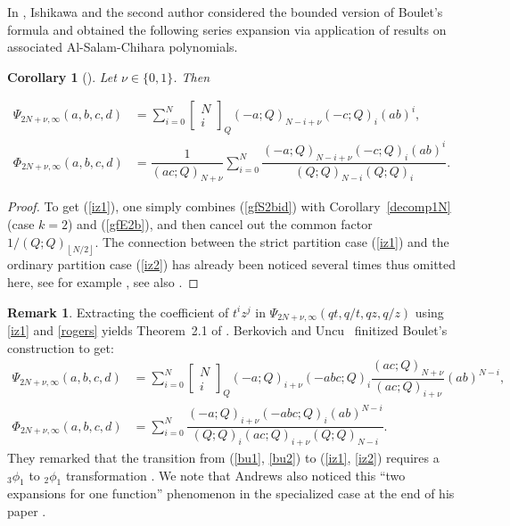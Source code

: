 \documentclass[12pt]{amsart}
\numberwithin{equation}{section}
\theoremstyle{plain}
\newtheorem{corollary}[theorem]{Corollary}
\theoremstyle{definition}
\newtheorem{remark}[theorem]{Remark}
\newcommand\qbin[3]{\left[\begin{matrix} #1 \\ #2 \end{matrix} \right]_{#3}}
\begin{document}
In \cite{iz}, Ishikawa and the second author considered the bounded version of Boulet's 
formula and obtained the following series expansion via application of results on associated Al-Salam-Chihara polynomials.
\begin{corollary}[\cite{iz}] Let $\nu\in\{0,1\}$. Then

\begin{align}
\label{iz1} \Psi_{2N+\nu,\infty}(a,b,c,d) &= \sum\limits_{i=0}^{N}\qbin{N}{i}{Q}(-a;Q)_{N-i+\nu}(-c;Q)_{i}(ab)^i, \\
\label{iz2} \Phi_{2N+\nu,\infty}(a,b,c,d) &= \dfrac{1}{(ac;Q)_{N+\nu}}\sum\limits_{i=0}^{N}\dfrac{(-a;Q)_{N-i+\nu}(-c;Q)_{i}(ab)^i}{(Q;Q)_{N-i}(Q;Q)_{i}}.
\end{align}

\end{corollary}
\begin{proof}
To get (\ref{iz1}), one simply combines (\ref{gfS2bid}) with Corollary~\ref{decomp1N} (case $k=2$) and (\ref{gfE2b}), and then cancel out the common factor $1/(Q;Q)_{\left\lfloor{N}/{2}\right\rfloor}$. The connection between the strict partition case (\ref{iz1}) and the ordinary partition case (\ref{iz2}) has already been noticed several times thus omitted here, see for example \cite[Theorem 4.1]{iz}, see also \cite{bu2,bou}.
\end{proof}


\begin{remark}

Extracting the coefficient of $t^iz^j$ in $\Psi_{2N+\nu,\infty}(qt,q/t,qz,q/z)$ using \eqref{iz1} and \eqref{rogers} yields Theorem~2.1 of 
\cite{bu2}.
Berkovich and Uncu~\cite[Theorem 6.1]{bu2} finitized Boulet's construction \cite{bou} to get:
\begin{align}
\label{bu1} \Psi_{2N+\nu,\infty}(a,b,c,d) &= \sum\limits_{i=0}^{N}\qbin{N}{i}{Q}(-a;Q)_{i+\nu}(-abc;Q)_{i}\dfrac{(ac;Q)_{N+\nu}}{(ac;Q)_{i+\nu}}(ab)^{N-i}, \\
\label{bu2} \Phi_{2N+\nu,\infty}(a,b,c,d) &= \sum\limits_{i=0}^{N}\dfrac{(-a;Q)_{i+\nu}(-abc;Q)_i(ab)^{N-i}}{(Q;Q)_{i}(ac;Q)_{i+\nu}(Q;Q)_{N-i}}.
\end{align}
They remarked that the transition from (\ref{bu1}, \ref{bu2}) to (\ref{iz1}, \ref{iz2}) requires a ${}_3\phi_1$ to ${}_2\phi_1$ transformation \cite[(III.8)]{gara}. We note that Andrews also noticed this ``two expansions for one function'' phenomenon in the specialized case at the end of his paper \cite{and2}.
\end{remark}
\end{document}
